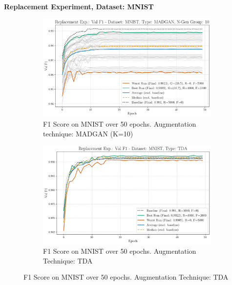 \newpage
 \noindent\textbf{Replacement Experiment, Dataset: MNIST}
\begin{figure}[H]
	\centering
	\begin{subfigure}{.85\textwidth}
		\includegraphics[width=\textwidth]{abb/strat_classifier_performance/MNIST_STRATIFIED_CLASSIFIERS_MADGAN_NEW/replacement_experiments/val_f1_score_MADGAN_MNIST_n_gen_10_all.png}
		\caption{F1 Score on MNIST over 50 epochs. Augmentation technique: MADGAN (K=10)}
        \label{fig:res_replacement_mnist_tda_vs_madgan__madgan}
	\end{subfigure}
	\begin{subfigure}{.85\textwidth}
		\includegraphics[width=\textwidth]{abb/strat_classifier_performance/tda_mnist/replacement_experiments/val_f1_score_tda_mnist_mnist_all.png}
		\caption{F1 Score on MNIST over 50 epochs. Augmentation Technique: TDA}
        \label{fig:res_replacement_mnist_tda_vs_madgan__tda}
	\end{subfigure}
\end{figure}

